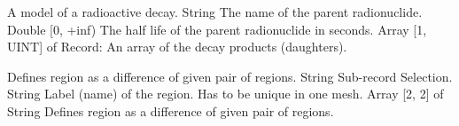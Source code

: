 \begin{RecordType}
	{}
	{} %
	{} %
	{} %
	{{{A model of a radioactive decay.}}}
		\KeyItem
			{}
			{{String}}
			{\textrangle}
			{} %
			{{{The name of the parent radionuclide.}}}
		\KeyItem
			{}
			{{Double [0, +inf)}}
			{\textrangle}
			{} %
			{{{The half life of the parent radionuclide in seconds.}}}
		\KeyItem
			{}
			{{Array [1, UINT] of }{Record}{: }}
			{\textrangle}
			{} %
			{{{An array of the decay products (daughters).}}}
\end{RecordType}
\begin{RecordType}
	{}
	{} %
	{} %
	{} %
	{{{Defines region as a difference of given pair of regions.}}}
		\KeyItem
			{}
			{{String}}
			{\textrangle}
			{} %
			{{{Sub-record Selection.}}}
		\KeyItem
			{}
			{{String}}
			{\textrangle}
			{} %
			{{{Label (name) of the region. Has to be unique in one mesh.}}}
		\KeyItem
			{}
			{{Array [2, 2] of }{String}}
			{\textrangle}
			{} %
			{{{Defines region as a difference of given pair of regions.}}}
\end{RecordType}
